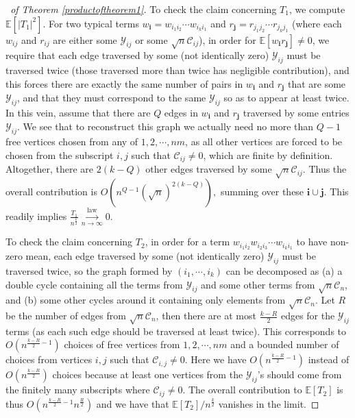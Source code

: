 \documentclass[12pt, reqno]{amsart}
\theoremstyle{definition}
\theoremstyle{remark}
\numberwithin{equation}{section}
\begin{document}
\begin{proof}[\proofname\ of Theorem \ref{productoftheorem1}]
To check the claim concerning $T_1$, we compute $\mathbb{E}[|T_1|^2]$. For two typical terms $w_{\mathbf{i}}=w_{i_1i_2}\cdots w_{i_ki_1}$ and $r_{\mathbf{j}}=r_{j_1j_2}\cdots r_{j_kj_1}$ (where each $w_{ij}$ and $r_{ij}$ are either some $\mathcal{Y}_{ij}$ or some $\sqrt{n}\mathcal{C}_{ij}$), in order for $\mathbb{E}[w_\mathbf{i}r_\mathbf{j}]\neq 0$, we require that each edge traversed by some (not identically zero) $\mathcal{Y}_{ij}$ must be traversed twice (those traversed more than twice has negligible contribution), and this forces there are exactly the same number of pairs in $w_\mathbf{i}$ and $r_\mathbf{j}$ that are some $\mathcal{Y}_{ij}$, and that they must correspond to the same $\mathcal{Y}_{ij}$ so as to appear at least twice. In this vein, assume that there are $Q$ edges in $w_\mathbf{i}$ and $r_\mathbf{j}$ traversed by some entries $\mathcal{Y}_{ij}$. We see that to reconstruct this graph we actually need no more than $Q-1$ free vertices chosen from any of $1,2,\cdots,nm$, as all other vertices are forced to be chosen from the subscript $i,j$ such that $\mathcal{C}_{ij}\neq 0$, which are finite by definition. Altogether, there are $2(k-Q)$ other edges traversed by some $\sqrt{n}\mathcal{C}_{ij}.$ Thus the overall contribution is $O(n^{Q-1}(\sqrt{n})^{2(k-Q)}),$ summing over these $\mathbf{i}\cup\mathbf{j}$. This readily implies $\frac{T_1}{n^{\frac{k}{2}}}\overset{\text{law}}{\underset{n\to\infty}\longrightarrow} 0.$

To check the claim concerning $T_2$, in order for a term $w_{i_1i_2}w_{i_2i_3}\cdots w_{i_ki_1}$ to have non-zero mean, each edge traversed by some (not identically zero) $\mathcal{Y}_{ij}$ must be traversed twice, so the graph formed by $(i_1,\cdots,i_k)$ can be decomposed as (a) a double cycle containing all the terms from $\mathcal{Y}_{ij}$ and some other terms from $\sqrt{n}\mathcal{C}_n$, and (b) some other cycles around it containing only elements from $\sqrt{n}\mathcal{C}_n$. Let $R$ be the number of edges from $\sqrt{n}\mathcal{C}_n$, then there are at most $\frac{k-R}{2}$ edges for the $\mathcal{Y}_{ij}$ terms (as each such edge should be traversed at least twice). This corresponds to $O(n^{\frac{k-R}{2}-1})$ choices of free vertices from $1,2,\cdots,nm$ and a bounded number of choices from vertices $i,j$ such that $\mathcal{C}_{i,j}\neq 0$. Here we have $O(n^{\frac{k-R}{2}-1})$ instead of $O(n^{\frac{k-R}{2}})$ choices because at least one vertices from the $\mathcal{Y}_{ij}$'s should come from the finitely many subscripts where $\mathcal{C}_{ij}\neq 0$. The overall contribution to $\mathbb{E}[T_2]$ is thus $O(n^{\frac{k-R}{2}-1}n^{\frac{R}{2}})$ and we have that $\mathbb{E}[T_2]/n^\frac{k}{2}$ vanishes in the limit. 


\end{proof}
\end{document}
